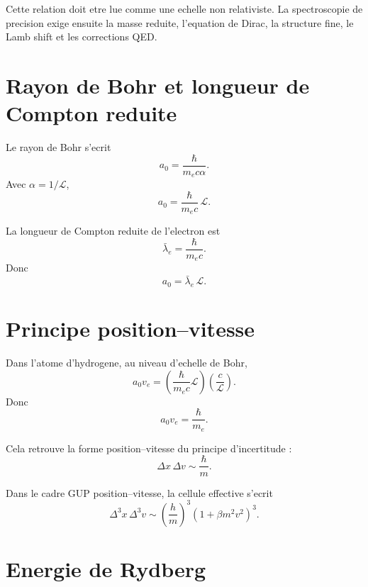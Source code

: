 \documentclass[11pt,a4paper]{article}
\newcommand{\cL}{\mathcal L}
\newcommand{\lambdabar}{\bar\lambda_e}
\begin{document}
Cette relation doit etre lue comme une echelle non relativiste. La
spectroscopie de precision exige ensuite la masse reduite, l'equation de
Dirac, la structure fine, le Lamb shift et les corrections QED.

\section{Rayon de Bohr et longueur de Compton reduite}

Le rayon de Bohr s'ecrit
\begin{equation}
a_0=\frac{\hbar}{m_e c\alpha}.
\end{equation}
Avec \(\alpha=1/\cL\),
\begin{equation}
\boxed{
a_0=\frac{\hbar}{m_e c}\,\cL.
}
\end{equation}

La longueur de Compton reduite de l'electron est
\begin{equation}
\lambdabar=\frac{\hbar}{m_e c}.
\end{equation}
Donc
\begin{equation}
\boxed{
a_0=\lambdabar\,\cL.
}
\end{equation}

\section{Principe position--vitesse}

Dans l'atome d'hydrogene, au niveau d'echelle de Bohr,
\begin{equation}
a_0 v_e=
\left(\frac{\hbar}{m_e c}\cL\right)
\left(\frac{c}{\cL}\right).
\end{equation}
Donc
\begin{equation}
\boxed{
a_0 v_e=\frac{\hbar}{m_e}.
}
\end{equation}

Cela retrouve la forme position--vitesse du principe d'incertitude :
\begin{equation}
\Delta x\,\Delta v\sim\frac{\hbar}{m}.
\end{equation}

Dans le cadre GUP position--vitesse, la cellule effective s'ecrit
\begin{equation}
\boxed{
\Delta^3x\,\Delta^3v
\sim
\left(\frac{h}{m}\right)^3(1+\beta m^2v^2)^3.
}
\end{equation}

\section{Energie de Rydberg}
\end{document}
